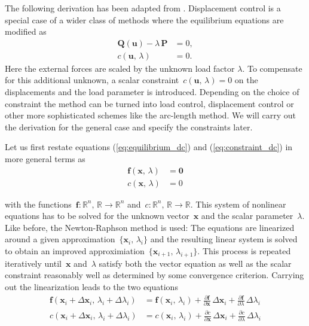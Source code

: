 The following derivation has been adapted from \cite{fem_script_uni_bochum}. Displacement control is a special case of a wider class of methods where the equilibrium equations are modified as
%
\begin{align}
\boldsymbol{Q}(\boldsymbol{u}) - \lambda\,\boldsymbol{P} &= 0,\label{eq:equilibrium_dc}\\
c(\boldsymbol{u},\,\lambda) &= 0.\label{eq:constraint_dc}
\end{align}
%
Here the external forces are scaled by the unknown load factor $\lambda$. To compensate for this additional unknown, a scalar constraint~$c(\boldsymbol{u},\,\lambda) = 0$ on the displacements and the load parameter is introduced. Depending on the choice of constraint the method can be turned into load control, displacement control or other more sophisticated schemes like the arc-length method. We will carry out the derivation for the general case and specify the constraints later.

Let us first restate equations (\ref{eq:equilibrium_dc}) and (\ref{eq:constraint_dc}) in more general terms as
%
\begin{align}
\boldsymbol{f}(\boldsymbol{x},\,\lambda) &= \boldsymbol{0} \label{eq:equilibrium_dc_gen} \\
c(\boldsymbol{x},\,\lambda) &= 0 \label{eq:constraint_dc_gen}
\end{align}

with the functions~$\boldsymbol{f}: \mathbb{R}^n,\,\mathbb{R} \rightarrow \mathbb{R}^n$ and~$c: \mathbb{R}^n,\,\mathbb{R} \rightarrow \mathbb{R}$.
This system of nonlinear equations has to be solved for the unknown vector~$\boldsymbol{x}$ and the scalar parameter~$\lambda$.
Like before, the Newton-Raphson method is used: The equations are linearized around a given approximation~$\{\boldsymbol{x}_i,\,\lambda_i\}$ and the resulting linear system is solved to obtain an improved approximiation~$\{\boldsymbol{x}_{i+1},\,\lambda_{i+1}\}$.
This process is repeated iteratively until~$\boldsymbol{x}$ and~$\lambda$ satisfy both the vector equation as well as the scalar constraint reasonably well as determined by some convergence criterion.
Carrying out the linearization leads to the two equations
%
\begin{align}
\boldsymbol{f}(\boldsymbol{x}_{i} + \Delta\boldsymbol{x}_{i},\,\lambda_{i} + \Delta\lambda_{i}) &= \boldsymbol{f}(\boldsymbol{x}_{i},\,\lambda_{i}) + \frac{\partial\boldsymbol{f}}{\partial\boldsymbol{x}}\,\Delta\boldsymbol{x}_{i} + \frac{\partial\boldsymbol{f}}{\partial\lambda}\,\Delta\lambda_{i} \label{eq:equilibrium_dc_lin} \\
c(\boldsymbol{x}_{i} + \Delta\boldsymbol{x}_{i},\,\lambda_{i} + \Delta\lambda_{i}) &= c(\boldsymbol{x}_{i},\,\lambda_{i}) + \frac{\partial c}{\partial\boldsymbol{x}}\,\Delta\boldsymbol{x}_{i} + \frac{\partial c}{\partial\lambda}\,\Delta\lambda_{i} \label{eq:constraints_dc_lin}
\end{align}

